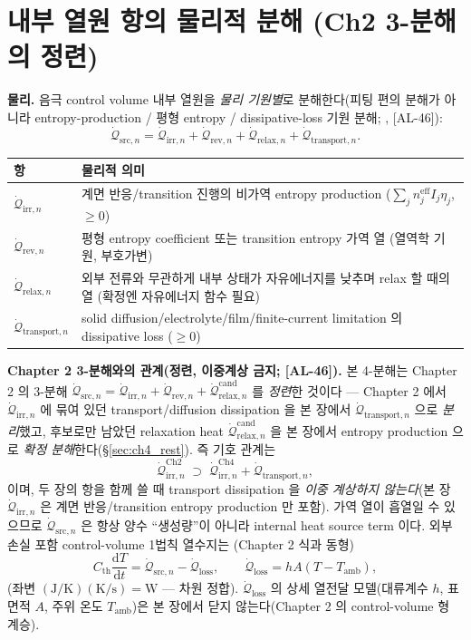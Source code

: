 \documentclass[11pt,a4paper]{article}
\newcommand{\dd}{\mathrm{d}}
\newcommand{\eff}{\mathrm{eff}}
\newcommand{\irr}{\mathrm{irr}}
\newcommand{\rev}{\mathrm{rev}}
\newcommand{\src}{\mathrm{src}}
\newcommand{\loss}{\mathrm{loss}}
\newcommand{\rlx}{\mathrm{relax}}
\newcommand{\cand}{\mathrm{cand}}
\newcommand{\transp}{\mathrm{transport}}
\newcommand{\amb}{\mathrm{amb}}
\newcommand{\AL}[1]{\textsf{[AL-#1]}}
\begin{document}
\section{내부 열원 항의 물리적 분해 (Ch2 3-분해의 정련)}\label{sec:ch4_decomp}
\textbf{물리.} 음극 control volume 내부 열원을 \emph{물리 기원별}로 분해한다(피팅 편의 분해가 아니라
entropy-production / 평형 entropy / dissipative-loss 기원 분해; \cite{bernardi1985,rao1997}, \AL{46}):
\begin{equation}
\dot{\mathcal Q}_{\src,n}=\dot{\mathcal Q}_{\irr,n}+\dot{\mathcal Q}_{\rev,n}+\dot{\mathcal Q}_{\rlx,n}+\dot{\mathcal Q}_{\transp,n}.
\label{eq:ch4_decomp}
\end{equation}
\begin{longtable}{p{} >{\raggedright\arraybackslash}p{}}
\toprule 항 & 물리적 의미 \\ \midrule \endhead
$\dot{\mathcal Q}_{\irr,n}$ & 계면 반응/transition 진행의 비가역 entropy production ($\sum_j n_j^{\eff}I_j\eta_j$, $\ge0$) \\
$\dot{\mathcal Q}_{\rev,n}$ & 평형 entropy coefficient 또는 transition entropy 가역 열 (열역학 기원, 부호가변) \\
$\dot{\mathcal Q}_{\rlx,n}$ & 외부 전류와 무관하게 내부 상태가 자유에너지를 낮추며 relax 할 때의 열 (확정엔 자유에너지 함수 필요) \\
$\dot{\mathcal Q}_{\transp,n}$ & solid diffusion/electrolyte/film/finite-current limitation 의 dissipative loss ($\ge0$) \\
\bottomrule
\end{longtable}
\textbf{Chapter 2 3-분해와의 관계(정련, 이중계상 금지; \AL{46}).} 본 4-분해는 Chapter 2 의 3-분해
$\dot{\mathcal Q}_{\src,n}=\dot{\mathcal Q}_{\irr,n}+\dot{\mathcal Q}_{\rev,n}+\dot{\mathcal Q}_{\rlx,n}^{\cand}$
를 \emph{정련}한 것이다 — Chapter 2 에서 $\dot{\mathcal Q}_{\irr,n}$ 에 묶여 있던 transport/diffusion
dissipation 을 본 장에서 $\dot{\mathcal Q}_{\transp,n}$ 으로 \emph{분리}했고, 후보로만 남았던 relaxation heat
$\dot{\mathcal Q}_{\rlx,n}^{\cand}$ 을 본 장에서 entropy production 으로 \emph{확정 분해}한다(\S\ref{sec:ch4_rest}).
즉 기호 관계는
\begin{equation}
\dot{\mathcal Q}_{\irr,n}^{\mathrm{Ch2}}\;\supset\;\dot{\mathcal Q}_{\irr,n}^{\mathrm{Ch4}}+\dot{\mathcal Q}_{\transp,n},
\label{eq:ch4_ch2refine}
\end{equation}
이며, 두 장의 항을 함께 쓸 때 transport dissipation 을 \emph{이중 계상하지 않는다}(본 장 $\dot{\mathcal Q}_{\irr,n}$
은 계면 반응/transition entropy production 만 포함). 가역 열이 흡열일 수 있으므로 $\dot{\mathcal Q}_{\src,n}$
은 항상 양수 ``생성량''이 아니라 internal heat source term 이다. 외부 손실 포함 control-volume 1법칙 열수지는
(Chapter 2 식과 동형)
\begin{equation}
C_{\mathrm{th}}\frac{\dd T}{\dd t}=\dot{\mathcal Q}_{\src,n}-\dot{\mathcal Q}_{\loss},\qquad
\dot{\mathcal Q}_{\loss}=hA(T-T_\amb),
\label{eq:ch4_balance}
\end{equation}
(좌변 $\mathrm{(J/K)(K/s)=W}$ — 차원 정합). $\dot{\mathcal Q}_{\loss}$ 의 상세 열전달 모델(대류계수 $h$, 표면적
$A$, 주위 온도 $T_\amb$)은 본 장에서 닫지 않는다(Chapter 2 의 control-volume 형 계승).
\end{document}
